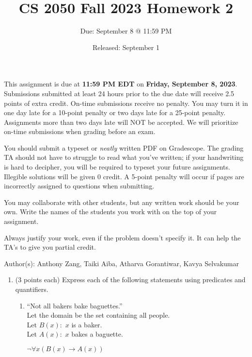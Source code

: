 \documentclass[11pt]{article}
\title{CS 2050 Fall 2023 Homework 2}
\author{Due: September 8 @ 11:59 PM}
\date{Released: September 1}
\newcommand{\pte}[1]{\textcolor{maincolor}{(#1 points each)}}
\begin{document}
\maketitle


\begin{justify}



This assignment is due at \textbf{11:59 PM EDT} on \textbf{Friday, September 8, 2023}. Submissions submitted at least 24 hours prior to the due date will receive 2.5 points of extra credit. On-time submissions receive no penalty. You may turn it in one day late for a 10-point penalty or two days late for a 25-point penalty. Assignments more than two days late will NOT be accepted.  We will prioritize on-time submissions when grading before an exam.

\bigskip

You should submit a typeset or \emph{neatly} written PDF on Gradescope.  The grading TA should not have to struggle to read what you've written; if your handwriting is hard to decipher, you will be required to typeset your future assignments. Illegible solutions will be given 0 credit. A 5-point penalty will occur if pages are incorrectly assigned to questions when submitting.

\bigskip

You may collaborate with other students, but any written work should be your own. Write the names of the students you work with on the top of your assignment.

\bigskip

Always justify your work, even if the problem doesn't specify it. It can help the TA's to give you partial credit.

\bigskip

Author(s): Anthony Zang, Taiki Aiba, Atharva Gorantiwar, Kavya Selvakumar

\clearpage

\begin{enumerate}

    \item \pte{3} Express each of the following statements using predicates and quantifiers.

    \begin{enumerate}
        \item ``Not all bakers bake baguettes.''\\
              Let the domain be the set containing all people.\\
              Let $B(x):$ $x$ is a baker.\\
              Let $A(x):$ $x$ bakes a baguette.
        \begin{mdframed}
            $\lnot \forall x (B(x) \rightarrow A(x))$ 
        \end{mdframed}


\end{enumerate}
\end{enumerate}
\end{justify}
\end{document}
